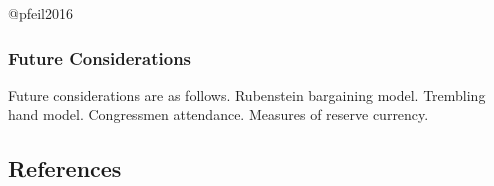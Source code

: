 \documentclass[
  12pt]{article}
\begin{document}
@pfeil2016

\citet{pfeil2016}

\hypertarget{future-considerations}{%
\subsubsection{Future Considerations}\label{future-considerations}}

Future considerations are as follows. Rubenstein bargaining model.
Trembling hand model. Congressmen attendance. Measures of reserve
currency.

\hypertarget{references}{%
\subsection{References}\label{references}}


  
\end{document}
